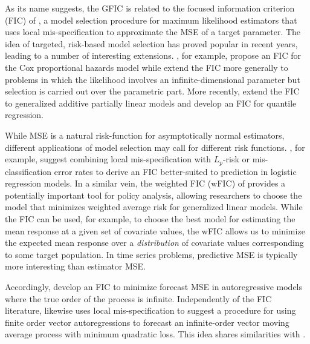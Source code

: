 As its name suggests, the GFIC is related to the focused information criterion (FIC) of \cite{ClaeskensHjort2003}, a model selection procedure for maximum likelihood estimators that uses local mis-specification to approximate the MSE of a target parameter. 
The idea of targeted, risk-based model selection has proved popular in recent years, leading to a number of interesting extensions. 
\cite{HjortClaeskens2006}, for example, propose an FIC for the Cox proportional hazards model while \cite{ClaeskensCarroll} extend the FIC more generally to problems in which the likelihood involves an infinite-dimensional parameter but selection is carried out over the parametric part. 
More recently, \cite{ZhangLiang} extend the FIC to generalized additive partially linear models and \cite{BehlClaeskensDette} develop an FIC for quantile regression.

While MSE is a natural risk-function for asymptotically normal estimators, different applications of model selection may call for different risk functions. \cite{ClaeskensCroux2006}, for example, suggest combining local mis-specification with $L_p$-risk or mis-classification error rates to derive an FIC better-suited to prediction in logistic regression models. 
In a similar vein, the weighted FIC (wFIC) of \cite{ClaeskensHjort2008} provides a potentially important tool for policy analysis, allowing researchers to choose the model that minimizes weighted average risk for generalized linear models. 
While the FIC can be used, for example, to choose the best model for estimating the mean response at a given set of covariate values, the wFIC allows us to minimize the expected mean response over a \emph{distribution} of covariate values corresponding to some target population.
In time series problems, predictive MSE is typically more interesting than estimator MSE.

Accordingly, \cite{ClaeskensCroux} develop an FIC to minimize forecast MSE in autoregressive models where the true order of the process is infinite. 
Independently of the FIC literature, \cite{Schorfheide2005} likewise uses local mis-specification to suggest a procedure for using finite order vector autoregressions to forecast an infinite-order vector moving average process with minimum quadratic loss. 
This idea shares similarities with \cite{Skouras2001}.
 
